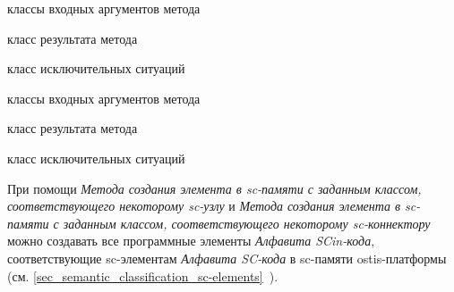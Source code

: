 \begin{SCn}
\begin{scnsubstruct}
\begin{scnsubstruct}
\begin{scnindent}
\end{scnindent}
\begin{scnrelfromvector}{классы входных аргументов метода}
\end{scnrelfromvector}
\begin{scnrelfromlist}{класс результата метода}
\end{scnrelfromlist}
\begin{scnrelfromlist}{класс исключительных ситуаций}
\end{scnrelfromlist}

\begin{scnindent}
\end{scnindent}
\begin{scnrelfromvector}{классы входных аргументов метода}
\end{scnrelfromvector}
\begin{scnrelfromlist}{класс результата метода}
\end{scnrelfromlist}
\begin{scnrelfromlist}{класс исключительных ситуаций}
\end{scnrelfromlist}

\end{scnsubstruct}

\end{scnsubstruct}
\end{SCn}

При помощи \textit{Метода создания элемента в sc-памяти с заданным классом, соответствующего некоторому sc-узлу} и \textit{Метода создания элемента в sc-памяти с заданным классом, соответствующего некоторому sc-коннектору} можно создавать все программные элементы \textit{Алфавита SCin-кода\scnsupergroupsign}, соответствующие sc-элементам \textit{Алфавита SC-кода\scnsupergroupsign} в sc-памяти ostis-платформы (см. \ref{sec_semantic_classification_sc-elements}~). 

